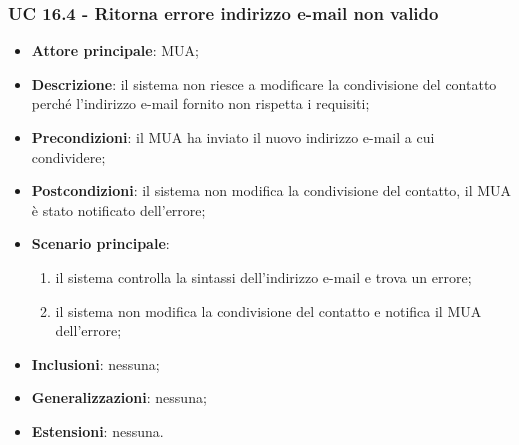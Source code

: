     \subsubsection{UC 16.4 - Ritorna errore indirizzo e-mail non valido} \label{sec:UC16.4}
    \begin{itemize}
        \item \textbf{Attore principale}: MUA;
        \item \textbf{Descrizione}: il sistema non riesce a modificare la condivisione del contatto perché l'indirizzo e-mail fornito non rispetta i requisiti;
        \item \textbf{Precondizioni}: il MUA ha inviato il nuovo indirizzo e-mail a cui condividere;
        \item \textbf{Postcondizioni}: il sistema non modifica la condivisione del contatto, il MUA è stato notificato dell'errore;
        \item \textbf{Scenario principale}:
            \begin{enumerate}
                \item il sistema controlla la sintassi dell'indirizzo e-mail e trova un errore;
                \item il sistema non modifica la condivisione del contatto e notifica il MUA dell'errore;
            \end{enumerate}
        \item \textbf{Inclusioni}: nessuna;
        \item \textbf{Generalizzazioni}: nessuna;
        \item \textbf{Estensioni}: nessuna.
    \end{itemize}
